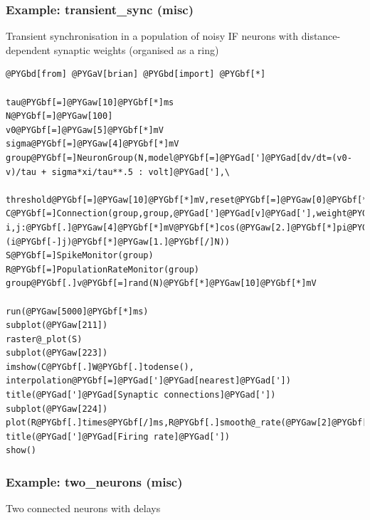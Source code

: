\documentclass[letterpaper,10pt,english]{manual}
\begin{document}
\hypertarget{index-88}{}\subsubsection{Example: transient\_sync (misc)}

Transient synchronisation in a population of noisy IF neurons
with distance-dependent synaptic weights (organised as a ring)

\begin{Verbatim}[commandchars=@\[\]]
@PYGbd[from] @PYGaV[brian] @PYGbd[import] @PYGbf[*]

tau@PYGbf[=]@PYGaw[10]@PYGbf[*]ms
N@PYGbf[=]@PYGaw[100]
v0@PYGbf[=]@PYGaw[5]@PYGbf[*]mV
sigma@PYGbf[=]@PYGaw[4]@PYGbf[*]mV
group@PYGbf[=]NeuronGroup(N,model@PYGbf[=]@PYGad[']@PYGad[dv/dt=(v0-v)/tau + sigma*xi/tau**.5 : volt]@PYGad['],\
                  threshold@PYGbf[=]@PYGaw[10]@PYGbf[*]mV,reset@PYGbf[=]@PYGaw[0]@PYGbf[*]mV)
C@PYGbf[=]Connection(group,group,@PYGad[']@PYGad[v]@PYGad['],weight@PYGbf[=]@PYGay[lambda] i,j:@PYGbf[.]@PYGaw[4]@PYGbf[*]mV@PYGbf[*]cos(@PYGaw[2.]@PYGbf[*]pi@PYGbf[*](i@PYGbf[-]j)@PYGbf[*]@PYGaw[1.]@PYGbf[/]N))
S@PYGbf[=]SpikeMonitor(group)
R@PYGbf[=]PopulationRateMonitor(group)
group@PYGbf[.]v@PYGbf[=]rand(N)@PYGbf[*]@PYGaw[10]@PYGbf[*]mV

run(@PYGaw[5000]@PYGbf[*]ms)
subplot(@PYGaw[211])
raster@_plot(S)
subplot(@PYGaw[223])
imshow(C@PYGbf[.]W@PYGbf[.]todense(), interpolation@PYGbf[=]@PYGad[']@PYGad[nearest]@PYGad['])
title(@PYGad[']@PYGad[Synaptic connections]@PYGad['])
subplot(@PYGaw[224])
plot(R@PYGbf[.]times@PYGbf[/]ms,R@PYGbf[.]smooth@_rate(@PYGaw[2]@PYGbf[*]ms,@PYGaX[filter]@PYGbf[=]@PYGad[']@PYGad[flat]@PYGad[']))
title(@PYGad[']@PYGad[Firing rate]@PYGad['])
show()
\end{Verbatim}

\resetcurrentobjects
\hypertarget{--doc-examples-misc_two_neurons}{}

\hypertarget{index-89}{}\subsubsection{Example: two\_neurons (misc)}

Two connected neurons with delays
\end{document}
